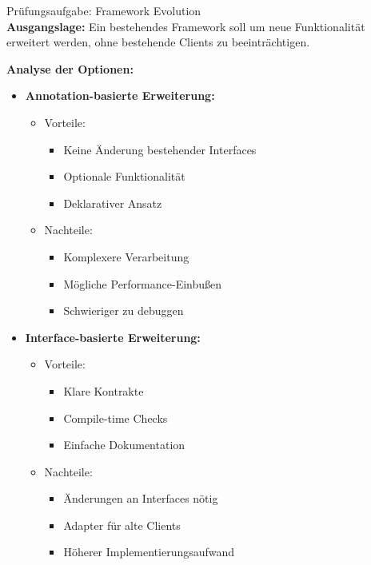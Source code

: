 \begin{example2}{Prüfungsaufgabe: Framework Evolution}\\
\textbf{Ausgangslage:}
Ein bestehendes Framework soll um neue Funktionalität erweitert werden, ohne bestehende 
Clients zu beeinträchtigen.

\textbf{Analyse der Optionen:}
\begin{itemize}
    \item \textbf{Annotation-basierte Erweiterung:}
    \begin{itemize}
        \item Vorteile:
        \begin{itemize}
            \item Keine Änderung bestehender Interfaces
            \item Optionale Funktionalität
            \item Deklarativer Ansatz
        \end{itemize}
        \item Nachteile:
        \begin{itemize}
            \item Komplexere Verarbeitung
            \item Mögliche Performance-Einbußen
            \item Schwieriger zu debuggen
        \end{itemize}
    \end{itemize}
    
    \item \textbf{Interface-basierte Erweiterung:}
    \begin{itemize}
        \item Vorteile:
        \begin{itemize}
            \item Klare Kontrakte
            \item Compile-time Checks
            \item Einfache Dokumentation
        \end{itemize}
        \item Nachteile:
        \begin{itemize}
            \item Änderungen an Interfaces nötig
            \item Adapter für alte Clients
            \item Höherer Implementierungsaufwand
        \end{itemize}
    \end{itemize}
\end{itemize}
\end{example2}

